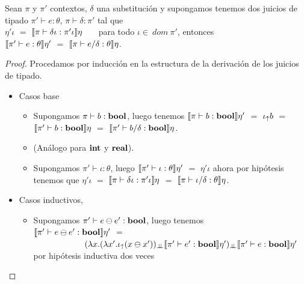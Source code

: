 \begin{theorem}[De substituci\'on]
Sean $\pi$ y $\pi'$ contextos, $\delta$ una substituci\'on y supongamos
tenemos dos juicios de tipado $\pi' \vdash e : \theta$, $\pi \vdash \delta : \pi'$ 
tal que \\

$\eta'\iota$ $=$ $\llbracket \pi \vdash \delta\iota : \pi'\iota \rrbracket\eta$ \ \ \ 
para todo $\iota \in \ dom \ \pi'$, entonces\\
 
$\llbracket \pi' \vdash e : \theta \rrbracket\eta'$ $=$ $\llbracket \pi \vdash e / \delta : \theta \rrbracket\eta$.

\end{theorem}


\begin{proof}
Procedamos por inducci\'on en la estructura de la derivaci\'on de los juicios de tipado.

\begin{itemize}
\item Casos base
\begin{itemize}
\item Supongamos $\pi \vdash b : \textbf{bool}$, luego tenemos 
$\llbracket \pi \vdash b : \textbf{bool} \rrbracket\eta'$ $=$ $\iota_{\uparrow} b$ $=$ 
$\llbracket \pi' \vdash b : \textbf{bool} \rrbracket\eta$ $=$ $\llbracket \pi' \vdash b / \delta : \textbf{bool} \rrbracket\eta$.

\item (An\'alogo para $\textbf{int}$ y $\textbf{real}$).

\item Supongamos $\pi' \vdash \iota : \theta$, luego 
$\llbracket \pi' \vdash \iota : \theta \rrbracket\eta'$ $=$ $\eta'\iota$
ahora por hip\'otesis tenemos que 
$\eta'\iota$ $=$ $\llbracket \pi \vdash \delta\iota : \pi'\iota \rrbracket\eta$ $=$
$\llbracket \pi \vdash \iota / \delta : \theta \rrbracket\eta$.
\end{itemize}

\item Casos inductivos,
\begin{itemize}
\item Supongamos $\pi' \vdash e \ominus e' : \textbf{bool}$, luego tenemos \\
$\llbracket \pi' \vdash e \ominus e' : \textbf{bool} \rrbracket\eta'$ $=$\\
\indent \ \ \ \ \ \ \ \ \ \ \ \
	$(\lambda x . 
		(\lambda x' . \iota_{\uparrow} (x \ominus x'))_{\bot \!\!\! \bot}
					\llbracket \pi' \vdash e' : \textbf{bool} \rrbracket\eta')_{\bot \!\!\! \bot}
						\llbracket \pi' \vdash e : \textbf{bool} \rrbracket\eta'$\\
						
por hip\'otesis inductiva dos veces\\


\end{itemize}
\end{itemize}
\end{proof}
